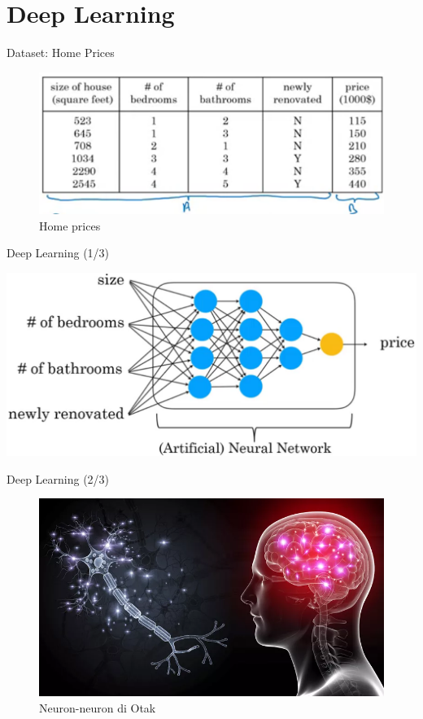 \documentclass[pdf]{beamer}
\theoremstyle{mystyle}
\begin{document}
\section{Deep Learning}
\begin{frame}{Dataset: Home Prices}
		\begin{figure}[!ht]
		\centering
		\includegraphics[scale=.25]{ml-vs-ds}		
		\caption{Home prices~\citep{ng2019AIForEveryone}}
	\end{figure}
\end{frame}

\begin{frame}{Deep Learning (1/3)}
	\begin{center}
		\includegraphics[scale=.275]{deep-learning}
	\end{center}	
\end{frame}

\begin{frame}{Deep Learning (2/3)}
		\begin{figure}[!ht]
	\centering
	\includegraphics[scale=.4]{images/brain-neurons}		
	\caption{Neuron-neuron di Otak \citep{ankrom2020howbrain}}
\end{figure}
\end{frame}
\end{document}
